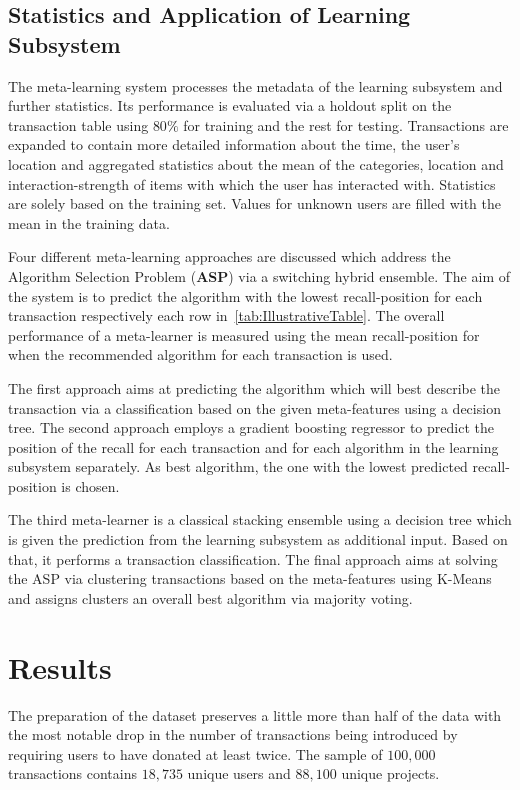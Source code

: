 \documentclass[runningheads]{llncs}
\begin{document}
\subsection{Statistics and Application of Learning Subsystem}
The meta-learning system processes the metadata of the learning subsystem and further statistics. Its performance is evaluated via a holdout split on the transaction table using $80\%$ for training and the rest for testing. Transactions are expanded to contain more detailed information about the time, the user's location and aggregated statistics about the mean of the categories, location and interaction-strength of items with which the user has interacted with. Statistics are solely based on the training set. Values for unknown users are filled with the mean in the training data.

Four different meta-learning approaches are discussed which address the Algorithm Selection Problem (\textbf{ASP}) via a switching hybrid ensemble. The aim of the system is to predict the algorithm with the lowest recall-position for each transaction respectively each row in~\autoref{tab:IllustrativeTable}. The overall performance of a meta-learner is measured using the mean recall-position for when the recommended algorithm for each transaction is used.

The first approach aims at predicting the algorithm which will best describe the transaction via a classification based on the given meta-features using a decision tree. The second approach employs a gradient boosting regressor to predict the position of the recall for each transaction and for each algorithm in the learning subsystem separately. As best algorithm, the one with the lowest predicted recall-position is chosen.

The third meta-learner is a classical stacking ensemble using a decision tree which is given the prediction from the learning subsystem as additional input. Based on that, it performs a transaction classification. The final approach aims at solving the ASP via clustering transactions based on the meta-features using K-Means and assigns clusters an overall best algorithm via majority voting.

\section{Results}
The preparation of the dataset preserves a little more than half of the data with the most notable drop in the number of transactions being introduced by requiring users to have donated at least twice. The sample of $100,000$ transactions contains $18,735$ unique users and $88,100$ unique projects.
\end{document}

